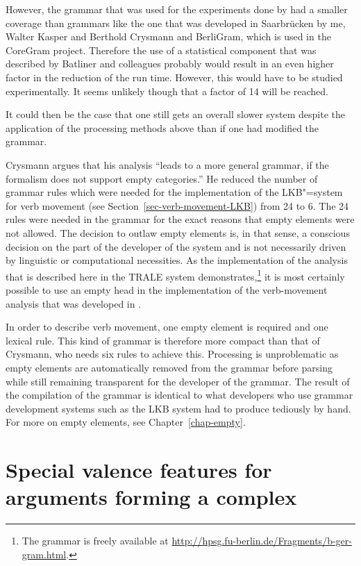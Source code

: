 \begin{exe}
\begin{xlist}
{        However, the grammar that was used for the experiments done by  had a
        smaller coverage than grammars like the one that was developed in Saarbrücken by me, Walter
        Kasper and Berthold Crysmann and BerliGram, which is used in the CoreGram project. Therefore
        the use of a statistical component that was described by Batliner and colleagues probably
        would result in an even higher factor in the reduction of the run time. However, this would
        have to be studied experimentally. It seems unlikely though that a factor of 14 will be reached.
	
	It could then be the case that one still gets an overall slower system despite the application of the processing
	methods above than if one had modified the grammar.
}

Crysmann argues that his analysis ``leads to a more general grammar, if the
formalism does not support empty categories.'' He reduced the number of grammar rules which were needed for the
implementation of the LKB"=system \citep{Copestake2002a-unlinked} for verb movement (see Section~\ref{sec-verb-movement-LKB}) from 24 to 6.
The 24 rules were needed in the grammar for the exact reasons that empty elements were not allowed. The decision
to outlaw empty elements is, in that sense, a conscious decision on the part of the developer of the system and
is not necessarily driven by linguistic or computational necessities. As the implementation of the
analysis that is described here
in the TRALE system \citep*{MPR2002a-u,Penn2004a-u} demonstrates,\footnote{
        The grammar is freely available at \url{http://hpsg.fu-berlin.de/Fragments/b-ger-gram.html}.
        } it is most certainly possible to use an empty
head in the implementation of the verb-movement analysis that was developed in \verbmobil.

In order to describe verb movement, one empty element is required and one lexical rule. This kind of
grammar is therefore more compact than that of Crysmann, who needs six rules to achieve
this. Processing is unproblematic as empty elements are automatically removed from the grammar
before parsing while still remaining transparent for the developer of the grammar. The result of the
compilation of the grammar is identical to what developers who use grammar development systems such
as the LKB system had to produce tediously by hand. For more on empty elements, see
Chapter~\ref{chap-empty}.



\section{Special valence features for arguments forming a complex}


\end{xlist}
\end{exe}
